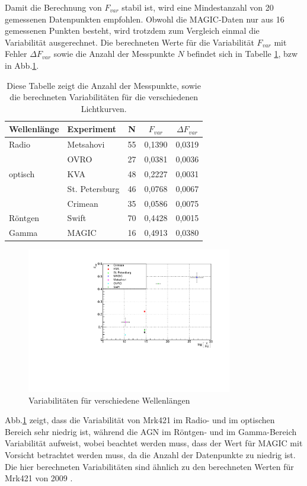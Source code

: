 Damit die Berechnung von $F_{var}$ stabil ist, wird eine Mindestanzahl von 20 gemessenen Datenpunkten empfohlen.
Obwohl die MAGIC-Daten nur aus 16 gemessenen Punkten besteht, wird trotzdem zum Vergleich einmal die Variabilität ausgerechnet.
Die berechneten Werte für die Variabilität $F_{var}$ mit Fehler $\Delta F_{var}$ sowie die Anzahl der Messpunkte $N$ befindet sich in Tabelle \ref{tab:Variabilitäten}, bzw in Abb.\ref{LC_Variabilities}.


\begin{table}[!h]
\centering
\caption{Diese Tabelle zeigt die Anzahl der Messpunkte, sowie die berechneten Variabilitäten für die verschiedenen Lichtkurven.}
\label{tab:Variabilitäten}
\begin{tabular}{llccc}
  \toprule
  Wellenlänge & Experiment & N & $F_{var}$ & $\Delta F_{var}$\\
  \midrule
  \midrule
  Radio & Metsahovi & 55 & 0,1390 & 0,0319 \\
  &OVRO & 27 & 0,0381 & 0,0036 \\
  optisch &KVA & 48 & 0,2227 & 0,0031 \\
  &St. Petersburg & 46 & 0,0768 & 0,0067 \\
  &Crimean & 35 & 0,0586 & 0,0075 \\
  Röntgen & Swift & 70 & 0,4428 & 0,0015\\
  Gamma & MAGIC & 16 & 0,4913 & 0,0380 \\
  \bottomrule
\end{tabular}
\end{table}


\begin{figure}
    \centering
    \includegraphics[width=0.8\textwidth]{./Plots/05_MWL/PlotVariabilities.pdf}
    \caption{Variabilitäten für verschiedene Wellenlängen}
    \label{LC_Variabilities}
\end{figure}

Abb.\ref{LC_Variabilities} zeigt, dass die Variabilität von Mrk421 im Radio- und im optischen Bereich sehr niedrig ist, während die AGN im Röntgen- und im Gamma-Bereich Variabilität aufweist, wobei beachtet werden muss, dass der Wert für MAGIC mit Vorsicht betrachtet werden muss, da die Anzahl der Datenpunkte zu niedrig ist.
Die hier berechneten Variabilitäten sind ähnlich zu den berechneten Werten für Mrk421 von 2009 \cite{MWL2009}.
